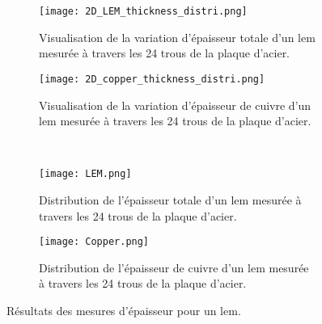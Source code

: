                 \begin{figure}[htpb]
                    \begin{subfigure}[t]{0.48\textwidth}
                        \texttt{[image: 2D\_LEM\_thickness\_distri.png]}
                        \caption{Visualisation de la variation d'épaisseur totale d'un \gls{lem} mesurée à travers les 24 trous de la plaque d'acier.}
                        \label{fig::distri_24_trou_lem_2D}
                    \end{subfigure}
                    \hfill
                    \begin{subfigure}[t]{0.48\textwidth}
                        \texttt{[image: 2D\_copper\_thickness\_distri.png]}
                        \caption{Visualisation de la variation d'épaisseur de cuivre d'un \gls{lem} mesurée à travers les 24 trous de la plaque d'acier.}
                        \label{fig::distri_24_trou_cuivre_2D}
                    \end{subfigure}\\
                    \begin{subfigure}[b]{0.48\textwidth}
                        \texttt{[image: LEM.png]}
                        \caption{Distribution de l'épaisseur totale d'un \gls{lem} mesurée à travers les 24 trous de la plaque d'acier.}
                        \label{fig::distri_24_trou_lem_1D}
                    \end{subfigure}
                    \hfill
                    \begin{subfigure}[b]{0.48\textwidth}
                        \texttt{[image: Copper.png]}
                        \caption{Distribution de l'épaisseur de cuivre d'un \gls{lem} mesurée à travers les 24 trous de la plaque d'acier.}
                        \label{fig::distri_24_trou_cuivre_1D}
                    \end{subfigure}
                    \caption[Résultats des mesures d'épaisseur pour un \gls{lem}.]{Résultats des mesures d'épaisseur pour un \gls{lem}.}
                    \label{fig::distri_epaisseur_1_lem}
                \end{figure}
                
